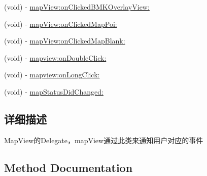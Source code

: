 \begin{DoxyCompactItemize}
\item 
(void) -\/ \hyperlink{protocol_b_m_k_map_view_delegate-p_a92829c083dcbd0b60209abb023b109fe}{map\+View\+:on\+Clicked\+B\+M\+K\+Overlay\+View\+:}
\item 
(void) -\/ \hyperlink{protocol_b_m_k_map_view_delegate-p_ac3e98436fce2ee14c02837200e57a6fe}{map\+View\+:on\+Clicked\+Map\+Poi\+:}
\item 
(void) -\/ \hyperlink{protocol_b_m_k_map_view_delegate-p_a7e98b75f0edfc05ed93fda98f3fb682e}{map\+View\+:on\+Clicked\+Map\+Blank\+:}
\item 
(void) -\/ \hyperlink{protocol_b_m_k_map_view_delegate-p_a957fb04d2fb88bd0e45ad9d712c1e85f}{mapview\+:on\+Double\+Click\+:}
\item 
(void) -\/ \hyperlink{protocol_b_m_k_map_view_delegate-p_abdef3e78c6a4d51665bc859e16c629a4}{mapview\+:on\+Long\+Click\+:}
\item 
(void) -\/ \hyperlink{protocol_b_m_k_map_view_delegate-p_a06d810eed5ca8add043ab4cd9367f14f}{map\+Status\+Did\+Changed\+:}
\end{DoxyCompactItemize}


\subsection{详细描述}
Map\+View的\+Delegate，map\+View通过此类来通知用户对应的事件 

\subsection{Method Documentation}
\hypertarget{protocol_b_m_k_map_view_delegate-p_a06d810eed5ca8add043ab4cd9367f14f}{}
